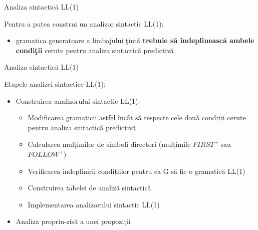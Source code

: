 \documentclass[pdf]{beamer}
\begin{document}
\begin{frame}{Analiza sintactică LL(1)}

Pentru a putea construi un analizor sintactic LL(1):

\begin{itemize}
\item
gramatica generatoare a limbajului ţintă \textbf{trebuie să îndeplinească ambele condiţii} cerute pentru analiza sintactică predictivă
\end{itemize}

\end{frame}



\begin{frame}{Analiza sintactică LL(1)}

Etapele analizei sintactice LL(1):

\begin{itemize}
\item
Construirea analizorului sintactic LL(1):

\begin{itemize}
\item
Modificarea gramaticii astfel încât să respecte cele două condiții cerute pentru analiza sintactică predictivă
\item
Calcularea mulțimilor de simboli directori (mulțimile $FIRST^+$ sau $FOLLOW^+$) 
\item
Verificarea îndeplinirii condițiilor pentru ca G să fie o gramatică LL(1)
\item
Construirea tabelei de analiză sintactică
\item
Implementarea analizorului sintactic LL(1)
\end{itemize}

\item
Analiza propriu-zisă a unei propoziții
\end{itemize}

\end{frame}
\end{document}
